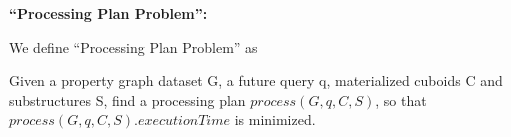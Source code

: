  
\textbf{``Processing Plan Problem'':}

We define ``Processing Plan Problem'' as


Given a property graph dataset G, a future query q, materialized cuboids C and substructures S, find a processing plan $process(G, q, C, S)$, so that $process(G, q, C, S).executionTime$ is minimized.
